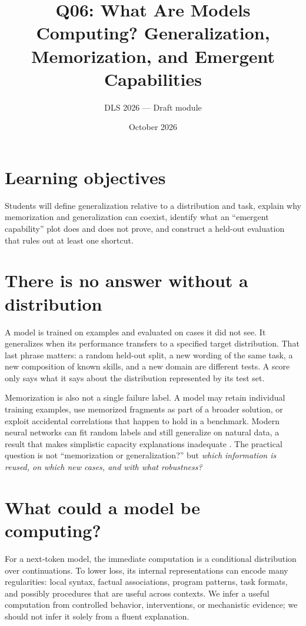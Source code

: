 \documentclass[11pt]{article}
\title{Q06: What Are Models Computing? Generalization, Memorization, and Emergent Capabilities}
\author{DLS 2026 --- Draft module}\date{October 2026}
\begin{document}
\maketitle
\section*{Learning objectives}
Students will define generalization relative to a distribution and task, explain why memorization and generalization can coexist, identify what an ``emergent capability'' plot does and does not prove, and construct a held-out evaluation that rules out at least one shortcut.

\section{There is no answer without a distribution}
A model is trained on examples and evaluated on cases it did not see. It generalizes when its performance transfers to a specified target distribution. That last phrase matters: a random held-out split, a new wording of the same task, a new composition of known skills, and a new domain are different tests. A score only says what it says about the distribution represented by its test set.

Memorization is also not a single failure label. A model may retain individual training examples, use memorized fragments as part of a broader solution, or exploit accidental correlations that happen to hold in a benchmark. Modern neural networks can fit random labels and still generalize on natural data, a result that makes simplistic capacity explanations inadequate \cite{zhang2021understanding}. The practical question is not ``memorization or generalization?'' but \emph{which information is reused, on which new cases, and with what robustness?}

\section{What could a model be computing?}
For a next-token model, the immediate computation is a conditional distribution over continuations. To lower loss, its internal representations can encode many regularities: local syntax, factual associations, program patterns, task formats, and possibly procedures that are useful across contexts. We infer a useful computation from controlled behavior, interventions, or mechanistic evidence; we should not infer it solely from a fluent explanation.
\end{document}
